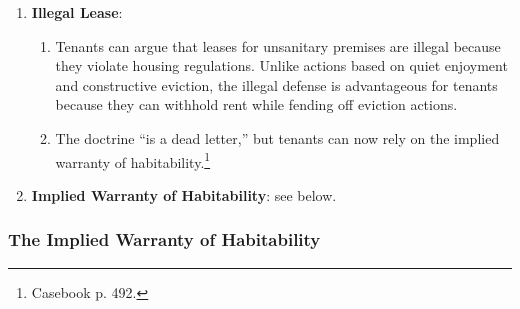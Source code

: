 \begin{enumerate}
\begin{enumerate}
\begin{enumerate}
            enjoyment.  \emph{Reste Realty Corp. v. Cooper}.
            \item There is a split of authority on whether the landlord is 
            liable for \textbf{third party conduct}, though the trend is 
            towards liability if the landlord had the legal right to control 
            the third party's conduct.\footnote{\emph{Understanding Property} 
            p. 258.}
        \end{enumerate}
    \end{enumerate}
    \item \textbf{Illegal Lease}:
    \begin{enumerate}
        \item Tenants can argue that leases for unsanitary premises are 
        illegal because they violate housing regulations. Unlike actions based 
        on quiet enjoyment and constructive eviction, the illegal defense is 
        advantageous for tenants because they can withhold rent while fending 
        off eviction actions.
        \item The doctrine ``is a dead letter,'' but tenants can now rely on 
        the implied warranty of habitability.\footnote{Casebook p. 492.}
    \end{enumerate}
    \item \textbf{Implied Warranty of Habitability}: see below.
\end{enumerate}

\subsubsection{The Implied Warranty of Habitability}

